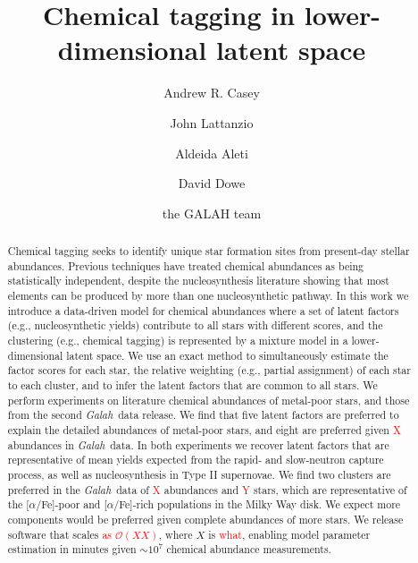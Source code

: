 \documentclass[twocolumn]{aastex62}
\newcommand{\project}[1]{\textsl{#1}}
\newcommand{\Galah}{\project{Galah}}
\newcommand{\todo}[1]{\textcolor{red}{#1}}
\begin{document}
\title{Chemical tagging in lower-dimensional latent space}


\author[0000-0003-0174-0564]{Andrew R. Casey}
			 
\author{John Lattanzio}

\author{Aldeida Aleti}

\author{David Dowe}
			 
\author{the GALAH team}


\begin{abstract}
Chemical tagging seeks to identify unique star formation sites from
present-day stellar abundances.
Previous techniques have treated chemical abundances as being 
statistically independent, despite the nucleosynthesis literature showing that
most elements can be produced by more than one nucleosynthetic pathway.
In this work we introduce a data-driven model for chemical abundances
where a set of latent factors (e.g., nucleosynthetic yields) contribute
to all stars with different scores, and the clustering (e.g., chemical tagging) 
is represented by a mixture model in a lower-dimensional latent space.
We use an exact method to simultaneously estimate the factor scores for
each star, the relative weighting (e.g., partial assignment) of each star
to each cluster, and to infer the latent factors that are common to all stars.
We perform experiments on literature chemical abundances
of metal-poor stars, and those from the second \Galah\ data release. 
We find that five latent factors are preferred to explain the detailed 
abundances of metal-poor stars, and eight are preferred given \todo{X} abundances
in \Galah\ data. In both experiments we recover latent factors that 
are representative of mean yields expected from the rapid- and slow-neutron
capture process, as well as nucleosynthesis in Type II supernovae. 
We find two clusters are preferred in the \Galah\ data of \todo{X} abundances
and \todo{Y} stars, which are representative of the [$\alpha$/Fe]-poor and 
[$\alpha$/Fe]-rich populations in the Milky Way disk. We expect more components
would be preferred given complete abundances of more stars.
We release software that scales \todo{as $\mathcal{O}(XX)$}, where $X$ is \todo{what},
enabling model parameter estimation in minutes given $\sim$$10^7$
chemical abundance measurements.
\end{abstract}
\end{document}
